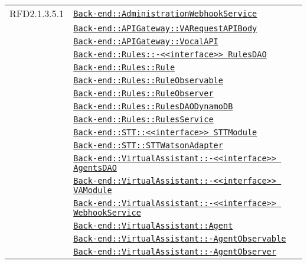 \begin{longtable}{|>{\centering}m{3cm}|m{10cm}<{\centering}|}
RFD2.1.3.5.1 & \hyperref[Back-end::AdministrationWebhookService]{\texttt{Back-end::AdministrationWebhookService}}\\
& \hyperref[Back-end::APIGateway::VARequestAPIBody]{\texttt{Back-end::APIGateway::VARequestAPIBody}}\\
& \hyperref[Back-end::APIGateway::VocalAPI]{\texttt{Back-end::APIGateway::VocalAPI}}\\
& \hyperref[Back-end::Rules::<<interface>> RulesDAO]{\texttt{Back-end::Rules::-\linebreak <<interface>> RulesDAO}}\\
& \hyperref[Back-end::Rules::Rule]{\texttt{Back-end::Rules::Rule}}\\
& \hyperref[Back-end::Rules::RuleObservable]{\texttt{Back-end::Rules::RuleObservable}}\\
& \hyperref[Back-end::Rules::RuleObserver]{\texttt{Back-end::Rules::RuleObserver}}\\
& \hyperref[Back-end::Rules::RulesDAODynamoDB]{\texttt{Back-end::Rules::RulesDAODynamoDB}}\\
& \hyperref[Back-end::Rules::RulesService]{\texttt{Back-end::Rules::RulesService}}\\
& \hyperref[Back-end::STT::<<interface>> STTModule]{\texttt{Back-end::STT::<<interface>> STTModule}}\\
& \hyperref[Back-end::STT::STTWatsonAdapter]{\texttt{Back-end::STT::STTWatsonAdapter}}\\
& \hyperref[Back-end::VirtualAssistant::<<interface>> AgentsDAO]{\texttt{Back-end::VirtualAssistant::-\linebreak <<interface>> AgentsDAO}}\\
& \hyperref[Back-end::VirtualAssistant::<<interface>> VAModule]{\texttt{Back-end::VirtualAssistant::-\linebreak <<interface>> VAModule}}\\
& \hyperref[Back-end::VirtualAssistant::<<interface>> WebhookService]{\texttt{Back-end::VirtualAssistant::-\linebreak <<interface>> WebhookService}}\\
& \hyperref[Back-end::VirtualAssistant::Agent]{\texttt{Back-end::VirtualAssistant::Agent}}\\
& \hyperref[Back-end::VirtualAssistant::AgentObservable]{\texttt{Back-end::VirtualAssistant::-\linebreak AgentObservable}}\\
& \hyperref[Back-end::VirtualAssistant::AgentObserver]{\texttt{Back-end::VirtualAssistant::-\linebreak AgentObserver}}\\

\end{longtable}

